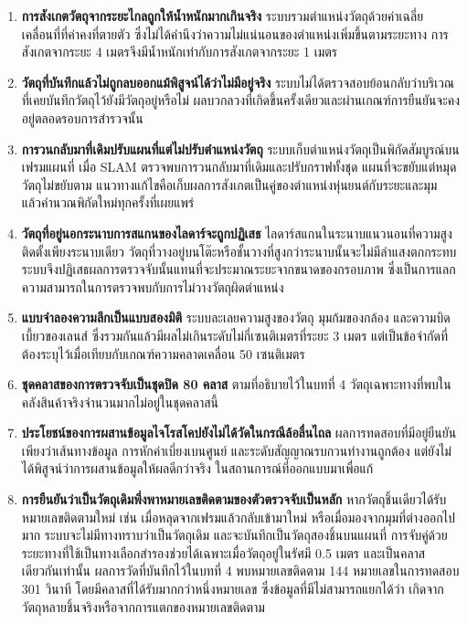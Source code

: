 \documentclass[a4paper,12pt]{report}
\begin{document}
\begin{enumerate}[label=\arabic*., leftmargin=1.25cm, itemsep=6pt, topsep=6pt]
    \item \textbf{การสังเกตวัตถุจากระยะไกลถูกให้น้ำหนักมากเกินจริง}
    ระบบรวมตำแหน่งวัตถุด้วยค่าเฉลี่ยเคลื่อนที่ที่ค่าคงที่ตายตัว
    ซึ่งไม่ได้คำนึงว่าความไม่แน่นอนของตำแหน่งเพิ่มขึ้นตามระยะทาง
    การสังเกตจากระยะ 4 เมตรจึงมีน้ำหนักเท่ากับการสังเกตจากระยะ 1 เมตร

    \item \textbf{วัตถุที่บันทึกแล้วไม่ถูกลบออกแม้พิสูจน์ได้ว่าไม่มีอยู่จริง}
    ระบบไม่ได้ตรวจสอบย้อนกลับว่าบริเวณที่เคยบันทึกวัตถุไว้ยังมีวัตถุอยู่หรือไม่
    ผลบวกลวงที่เกิดขึ้นครั้งเดียวและผ่านเกณฑ์การยืนยันจะคงอยู่ตลอดรอบการสำรวจนั้น

    \item \textbf{การวนกลับมาที่เดิมปรับแผนที่แต่ไม่ปรับตำแหน่งวัตถุ}
    ระบบเก็บตำแหน่งวัตถุเป็นพิกัดสัมบูรณ์บนเฟรมแผนที่
    เมื่อ SLAM ตรวจพบการวนกลับมาที่เดิมและปรับกราฟทั้งชุด แผนที่จะขยับแต่หมุดวัตถุไม่ขยับตาม
    แนวทางแก้ไขคือเก็บผลการสังเกตเป็นคู่ของตำแหน่งหุ่นยนต์กับระยะและมุม
    แล้วคำนวณพิกัดใหม่ทุกครั้งที่เผยแพร่

    \item \textbf{วัตถุที่อยู่นอกระนาบการสแกนของไลดาร์จะถูกปฏิเสธ}
    ไลดาร์สแกนในระนาบแนวนอนที่ความสูงติดตั้งเพียงระนาบเดียว
    วัตถุที่วางอยู่บนโต๊ะหรือชั้นวางที่สูงกว่าระนาบนั้นจะไม่มีลำแสงตกกระทบ
    ระบบจึงปฏิเสธผลการตรวจจับนั้นแทนที่จะประมาณระยะจากขนาดของกรอบภาพ
    ซึ่งเป็นการแลกความสามารถในการตรวจพบกับการไม่วางวัตถุผิดตำแหน่ง

    \item \textbf{แบบจำลองความลึกเป็นแบบสองมิติ}
    ระบบละเลยความสูงของวัตถุ มุมก้มของกล้อง และความบิดเบี้ยวของเลนส์
    ซึ่งรวมกันแล้วมีผลไม่เกินระดับไม่กี่เซนติเมตรที่ระยะ 3 เมตร
    แต่เป็นข้อจำกัดที่ต้องระบุไว้เมื่อเทียบกับเกณฑ์ความคลาดเคลื่อน 50 เซนติเมตร

    \item \textbf{ชุดคลาสของการตรวจจับเป็นชุดปิด 80 คลาส}
    ตามที่อธิบายไว้ในบทที่ 4 วัตถุเฉพาะทางที่พบในคลังสินค้าจริงจำนวนมากไม่อยู่ในชุดคลาสนี้

    \item \textbf{ประโยชน์ของการผสานข้อมูลไจโรสโคปยังไม่ได้วัดในกรณีล้อลื่นไถล}
    ผลการทดสอบที่มีอยู่ยืนยันเพียงว่าเส้นทางข้อมูล การหักค่าเบี่ยงเบนศูนย์
    และระดับสัญญาณรบกวนทำงานถูกต้อง แต่ยังไม่ได้พิสูจน์ว่าการผสานข้อมูลให้ผลดีกว่าจริง
    ในสถานการณ์ที่ออกแบบมาเพื่อแก้

    \item \textbf{การยืนยันว่าเป็นวัตถุเดิมพึ่งพาหมายเลขติดตามของตัวตรวจจับเป็นหลัก}
    หากวัตถุชิ้นเดียวได้รับหมายเลขติดตามใหม่ เช่น เมื่อหลุดจากเฟรมแล้วกลับเข้ามาใหม่
    หรือเมื่อมองจากมุมที่ต่างออกไปมาก ระบบจะไม่มีทางทราบว่าเป็นวัตถุเดิม
    และจะบันทึกเป็นวัตถุสองชิ้นบนแผนที่
    การจับคู่ด้วยระยะทางที่ใช้เป็นทางเลือกสำรองช่วยได้เฉพาะเมื่อวัตถุอยู่ในรัศมี 0.5 เมตร
    และเป็นคลาสเดียวกันเท่านั้น
    ผลการวัดที่บันทึกไว้ในบทที่ 4 พบหมายเลขติดตาม 144 หมายเลขในการทดสอบ 301 วินาที
    โดยมีคลาสที่ได้รับมากกว่าหนึ่งหมายเลข ซึ่งข้อมูลที่มีไม่สามารถแยกได้ว่า
    เกิดจากวัตถุหลายชิ้นจริงหรือจากการแตกของหมายเลขติดตาม


\end{enumerate}
\end{document}
